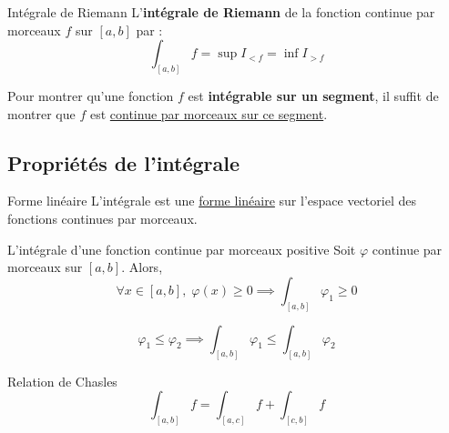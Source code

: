 \begin{Definition}[colbacktitle=red!75!black]{Intégrale de Riemann}{}
  L'\textbf{intégrale de Riemann} de la fonction continue par morceaux $f$ sur $[a,b]$ par : 
  \begin{equation}
    \int _{[a,b]} f = \sup I _{<f} = \inf I _{>f}
  \end{equation}

\end{Definition}


\begin{note}{}{}
Pour montrer qu'une fonction $f$ est \textbf{intégrable sur un segment}, il suffit de montrer que $f$ est \underline{continue par morceaux sur ce segment}.
\end{note}

\subsection{Propriétés de l'intégrale} %
\label{sub:Propriétés de l'intégrale}

\begin{Theorem}{Forme linéaire}{}
L'intégrale est une \underline{forme linéaire} sur l'{espace vectoriel des fonctions continues par morceaux}.
\end{Theorem}



\begin{Prop}{L'intégrale d'une fonction continue par morceaux positive}{}
  Soit $\varphi$ continue par morceaux sur $[a,b]$. Alors, 
  \begin{equation}
    \forall x \in [a,b], \; \varphi(x) \ge 0 \implies \int _{[a,b]} \varphi_1  \ge 0
  \end{equation}
\end{Prop}

\begin{Corollary}{}{}
\begin{equation}
  \varphi_1 \le \varphi_2 \implies \int _{[a,b]} \varphi_1 \le \int _{[a,b]} \varphi_2
\end{equation}
\end{Corollary}

\begin{Prop}{Relation de Chasles}{}
\begin{equation}
  \int_{[a,b]}f = \int_{[a,c]}^{} f + \int_{[c,b]}^{}f
\end{equation}
\end{Prop}



